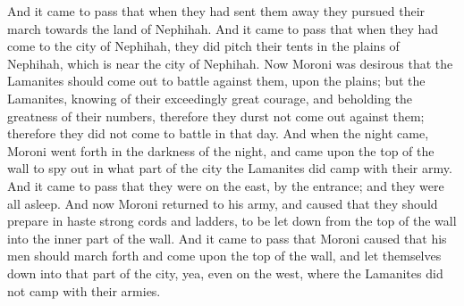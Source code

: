 And it came to pass that when they had sent them away they pursued their march towards the land of Nephihah. And it came to pass that when they had come to the city of Nephihah, they did pitch their tents in the plains of Nephihah, which is near the city of Nephihah.
\bverse \iffalse Now Moroni was desirous that the Lamanites should come out to battle against them, upon the plains; but the Lamanites, knowing of their exceedingly great courage, and beholding the greatness of their numbers, therefore they durst not come out against them; therefore they did not come to battle in that day. \fi
Now Moroni was desirous that the Lamanites should come out to battle against them, upon the plains; but the Lamanites, knowing of their exceedingly great courage, and beholding the greatness of their numbers, therefore they durst not come out against them; therefore they did not come to battle in that day.
\bverse \iffalse And when the night came, Moroni went forth in the darkness of the night, and came upon the top of the wall to spy out in what part of the city the Lamanites did camp with their army. \fi
And when the night came, Moroni went forth in the darkness of the night, and came upon the top of the wall to spy out in what part of the city the Lamanites did camp with their army.
\bverse \iffalse And it came to pass that they were on the east, by the entrance; and they were all asleep. And now Moroni returned to his army, and caused that they should prepare in haste strong cords and ladders, to be let down from the top of the wall into the inner part of the wall. \fi
And it came to pass that they were on the east, by the entrance; and they were all asleep. And now Moroni returned to his army, and caused that they should prepare in haste strong cords and ladders, to be let down from the top of the wall into the inner part of the wall.
\bverse \iffalse And it came to pass that Moroni caused that his men should march forth and come upon the top of the wall, and let themselves down into that part of the city, yea, even on the west, where the Lamanites did not camp with their armies. \fi
And it came to pass that Moroni caused that his men should march forth and come upon the top of the wall, and let themselves down into that part of the city, yea, even on the west, where the Lamanites did not camp with their armies.
\bverse \iffalse And it came to pass that they were all let down into the city by night, by the means of their strong cords and their ladders; thus when the morning came they were all within the walls of the city. \fi
